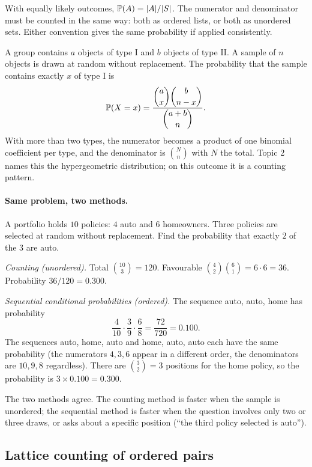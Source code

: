 With equally likely outcomes, $\mathbb{P}(A) = |A|/|S|$. The numerator and denominator must be
counted in the same way: both as ordered lists, or both as unordered sets. Either convention
gives the same probability if applied consistently.

\begin{keyfact}
A group contains $a$ objects of type I and $b$ objects of type II. A sample of $n$ objects is
drawn at random without replacement. The probability that the sample contains exactly $x$ of
type I is
\[
\mathbb{P}(X = x) = \frac{\dbinom{a}{x}\dbinom{b}{n-x}}{\dbinom{a+b}{n}} .
\]
With more than two types, the numerator becomes a product of one binomial coefficient per
type, and the denominator is $\binom{N}{n}$ with $N$ the total. Topic 2 names this the
hypergeometric distribution; on this outcome it is a counting pattern.
\end{keyfact}

\paragraph{Same problem, two methods.}
A portfolio holds $10$ policies: $4$ auto and $6$ homeowners. Three policies are selected at
random without replacement. Find the probability that exactly $2$ of the $3$ are auto.

\emph{Counting (unordered).} Total $\binom{10}{3} = 120$. Favourable
$\binom{4}{2}\binom{6}{1} = 6\cdot 6 = 36$. Probability $36/120 = 0.300$.

\emph{Sequential conditional probabilities (ordered).} The sequence auto, auto, home has
probability
\[
\frac{4}{10}\cdot\frac{3}{9}\cdot\frac{6}{8} = \frac{72}{720} = 0.100 .
\]
The sequences auto, home, auto and home, auto, auto each have the same probability (the
numerators $4,3,6$ appear in a different order, the denominators are $10,9,8$ regardless).
There are $\binom{3}{2}=3$ positions for the home policy, so the probability is
$3 \times 0.100 = 0.300$.

The two methods agree. The counting method is faster when the sample is unordered; the
sequential method is faster when the question involves only two or three draws, or asks
about a specific position (``the third policy selected is auto'').

\subsection{Lattice counting of ordered pairs}

